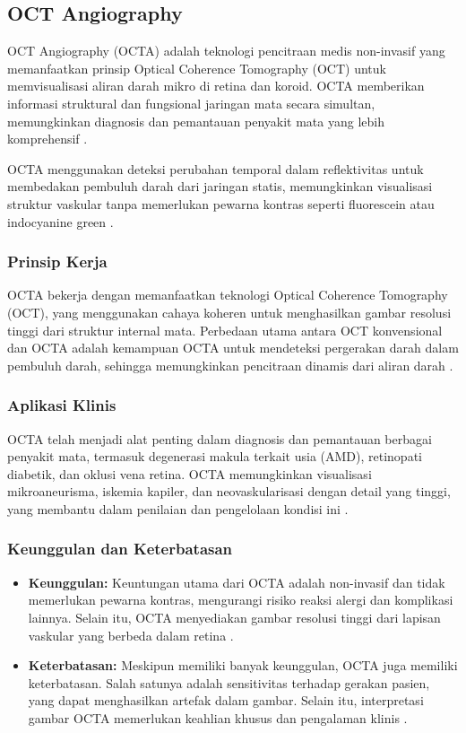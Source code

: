 \subsection{OCT Angiography}
\label{sec:222}

OCT Angiography (OCTA) adalah teknologi pencitraan medis non-invasif yang memanfaatkan prinsip Optical Coherence Tomography (OCT) untuk memvisualisasi aliran darah mikro di retina dan koroid. OCTA memberikan informasi struktural dan fungsional jaringan mata secara simultan, memungkinkan diagnosis dan pemantauan penyakit mata yang lebih komprehensif \parencite{Kashani2017-hn}.

OCTA menggunakan deteksi perubahan temporal dalam reflektivitas untuk membedakan pembuluh darah dari jaringan statis, memungkinkan visualisasi struktur vaskular tanpa memerlukan pewarna kontras seperti fluorescein atau indocyanine green \parencite{jia2012split}.

\subsubsection{Prinsip Kerja}

OCTA bekerja dengan memanfaatkan teknologi Optical Coherence Tomography (OCT), yang menggunakan cahaya koheren untuk menghasilkan gambar resolusi tinggi dari struktur internal mata. Perbedaan utama antara OCT konvensional dan OCTA adalah kemampuan OCTA untuk mendeteksi pergerakan darah dalam pembuluh darah, sehingga memungkinkan pencitraan dinamis dari aliran darah \parencite{spaide2018choriocapillaris}.

\subsubsection{Aplikasi Klinis}

OCTA telah menjadi alat penting dalam diagnosis dan pemantauan berbagai penyakit mata, termasuk degenerasi makula terkait usia (AMD), retinopati diabetik, dan oklusi vena retina. OCTA memungkinkan visualisasi mikroaneurisma, iskemia kapiler, dan neovaskularisasi dengan detail yang tinggi, yang membantu dalam penilaian dan pengelolaan kondisi ini \parencite{de2016optical}.

\subsubsection{Keunggulan dan Keterbatasan}

\begin{itemize}
    \item \textbf{Keunggulan:} Keuntungan utama dari OCTA adalah non-invasif dan tidak memerlukan pewarna kontras, mengurangi risiko reaksi alergi dan komplikasi lainnya. Selain itu, OCTA menyediakan gambar resolusi tinggi dari lapisan vaskular yang berbeda dalam retina \parencite{spaide2018retinal}.
    \item \textbf{Keterbatasan:} Meskipun memiliki banyak keunggulan, OCTA juga memiliki keterbatasan. Salah satunya adalah sensitivitas terhadap gerakan pasien, yang dapat menghasilkan artefak dalam gambar. Selain itu, interpretasi gambar OCTA memerlukan keahlian khusus dan pengalaman klinis \parencite{jia2012split}.
\end{itemize}

